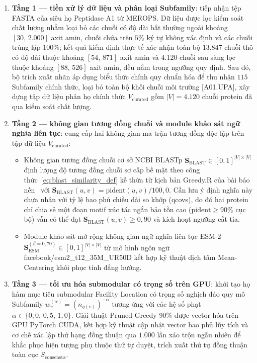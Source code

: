 \begin{enumerate}
    \item \textbf{Tầng 1 --- tiền xử lý dữ liệu và phân loại Subfamily}: tiếp nhận tệp FASTA của siêu họ Peptidase A1 từ MEROPS. Dữ liệu được lọc kiểm soát chất lượng nhằm loại bỏ các chuỗi có độ dài bất thường ngoài khoảng $[30, \, 2.000]$ axit amin, chuỗi chứa trên $5\%$ ký tự không xác định và các chuỗi trùng lặp $100\%$; kết quả kiểm định thực tế xác nhận toàn bộ $13.847$ chuỗi thô có độ dài thuộc khoảng $[54, \, 871]$ axit amin và $4.120$ chuỗi sau sàng lọc thuộc khoảng $[88, \, 526]$ axit amin, đều nằm trong ngưỡng quy định. Sau đó, bộ trích xuất nhãn áp dụng biểu thức chính quy chuẩn hóa để thu nhận $115$ Subfamily chính thức, loại bỏ toàn bộ khối chuỗi môi trường [A01.UPA], xây dựng tập dữ liệu phân họ chính thức $V_{\text{curated}}$ gồm $|V| = 4.120$ chuỗi protein đã qua kiểm soát chất lượng.
    
    \item \textbf{Tầng 2 --- không gian tương đồng chuỗi và module khảo sát ngữ nghĩa liên tục}: cung cấp hai không gian ma trận tương đồng độc lập trên tập dữ liệu $V_{\text{curated}}$:
    \begin{itemize}[noitemsep,topsep=1pt]
        \item Không gian tương đồng chuỗi cơ sở NCBI BLASTp $\mathbf{S}_{\text{BLAST}} \in [0, 1]^{|V| \times |V|}$ định lượng độ tương đồng chuỗi sơ cấp bề mặt theo công thức~\eqref{eq:blast_similarity_def} kế thừa từ kịch bản Greedy.R của bài báo nền~\cite{nguyen2025} với $\mathbf{S}_{\text{BLAST}}(u, v) = \text{pident}(u, v)/100{,}0$. Cần lưu ý định nghĩa này chưa nhân với tỷ lệ bao phủ chiều dài so khớp (qcovs), do đó hai protein chỉ chia sẻ một đoạn motif xúc tác ngắn bảo tồn cao ($\text{pident} \ge 90\%$ cục bộ) vẫn có thể đạt $\mathbf{S}_{\text{BLAST}}(u, v) \ge 0{,}90$ và kích hoạt ngưỡng cắt tỉa.
        \item Module khảo sát mở rộng không gian ngữ nghĩa liên tục ESM-2 $\mathbf{S}_{\text{ESM}}^{(\beta=0{,}70)} \in [0, 1]^{|V| \times |V|}$ từ mô hình ngôn ngữ facebook/esm2\_t12\_35M\_UR50D kết hợp kỹ thuật dịch tâm Mean-Centering khôi phục tính đẳng hướng.
    \end{itemize}
    
    \item \textbf{Tầng 3 --- tối ưu hóa submodular có trọng số trên GPU}: khởi tạo họ hàm mục tiêu submodular Facility Location có trọng số nghịch đảo quy mô Subfamily $w_v^{(\alpha)} = (n_{g(v)})^{-\alpha}$ tương ứng với các hệ số phạt $\alpha \in \{0{,}0, \, 0{,}5, \, 1{,}0\}$. Giải thuật Pruned Greedy 90\% được vector hóa trên GPU PyTorch CUDA, kết hợp kỹ thuật cập nhật vector bao phủ lũy tích và cơ chế xác lập thứ hạng đồng thuận qua $1.000$ lần xáo trộn ngẫu nhiên để khắc phục hiện tượng phụ thuộc thứ tự duyệt, trích xuất thứ tự đồng thuận toàn cục $S_{\text{consensus}}$.
    

\end{enumerate}
